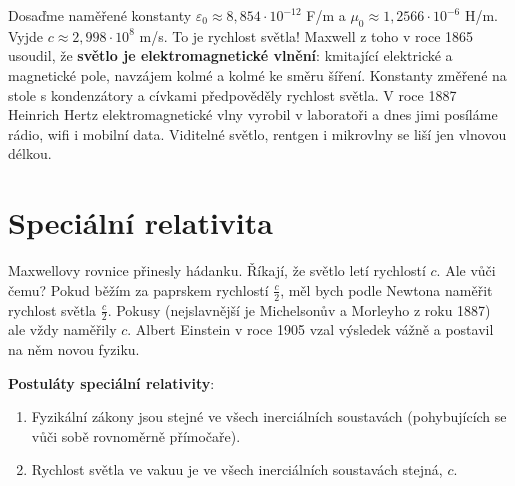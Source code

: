\begin{center}
\end{center}

Dosaďme naměřené konstanty $\varepsilon_0\approx 8{,}854\cdot 10^{-12}$ F/m a $\mu_0\approx 1{,}2566\cdot 10^{-6}$ H/m. Vyjde $c\approx 2{,}998\cdot 10^8$ m/s. To je rychlost světla! Maxwell z toho v roce 1865 usoudil, že \textbf{světlo je elektromagnetické vlnění}: kmitající elektrické a magnetické pole, navzájem kolmé a kolmé ke směru šíření. Konstanty změřené na stole s kondenzátory a cívkami předpověděly rychlost světla. V roce 1887 Heinrich Hertz elektromagnetické vlny vyrobil v laboratoři a dnes jimi posíláme rádio, wifi i mobilní data. Viditelné světlo, rentgen i mikrovlny se liší jen vlnovou délkou.

\section{Speciální relativita}

Maxwellovy rovnice přinesly hádanku. Říkají, že světlo letí rychlostí $c$. Ale vůči čemu? Pokud běžím za paprskem rychlostí $\frac{c}{2}$, měl bych podle Newtona naměřit rychlost světla $\frac{c}{2}$. Pokusy (nejslavnější je Michelsonův a Morleyho z roku 1887) ale vždy naměřily $c$. Albert Einstein v roce 1905 vzal výsledek vážně a postavil na něm novou fyziku.

\begin{definitionbox}
  \textbf{Postuláty speciální relativity}:
  \begin{enumerate}
    \item Fyzikální zákony jsou stejné ve všech inerciálních soustavách (pohybujících se vůči sobě rovnoměrně přímočaře).
    \item Rychlost světla ve vakuu je ve všech inerciálních soustavách stejná, $c$.
  \end{enumerate}
\end{definitionbox}

